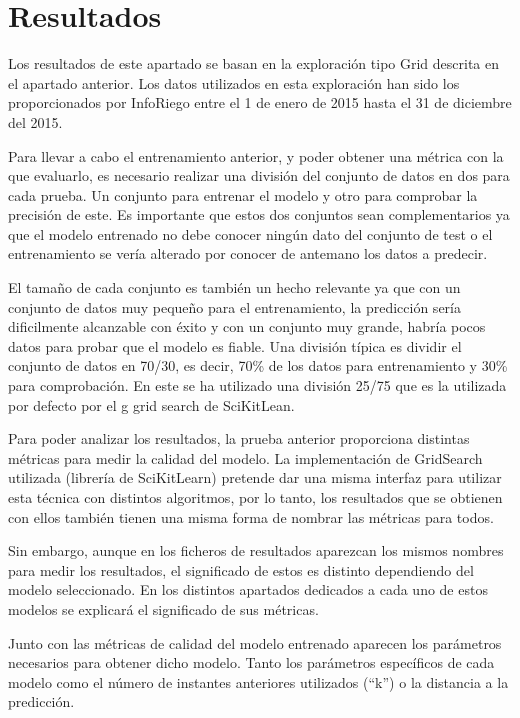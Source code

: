 \cleardoublepage

\chapter{Resultados}
\label{makereference7}

Los resultados de este apartado se basan en la exploración tipo Grid descrita en el apartado anterior. Los datos utilizados en esta exploración han sido los proporcionados por InfoRiego entre el 1 de enero de 2015 hasta el 31 de diciembre del 2015.

Para llevar a cabo el entrenamiento anterior, y poder obtener una métrica con la que evaluarlo, es necesario realizar una división del conjunto de datos en dos para cada prueba. Un conjunto para entrenar el modelo y otro para comprobar la precisión de este. Es importante que estos dos conjuntos sean complementarios ya que el modelo entrenado no debe conocer ningún dato del conjunto de test o el entrenamiento se vería alterado por conocer de antemano los datos a predecir.

El tamaño de cada conjunto es también un hecho relevante ya que con un conjunto de datos muy pequeño para el entrenamiento, la predicción sería dificilmente alcanzable con éxito y con un conjunto muy grande, habría pocos datos para probar que el modelo es fiable. Una división típica es dividir el conjunto de datos en 70/30, es decir, 70\% de los datos para entrenamiento y 30\% para comprobación. En este se ha utilizado una división 25/75 que es la utilizada por defecto por el g grid search de SciKitLean.

Para poder analizar los resultados, la prueba anterior proporciona distintas métricas para medir la calidad del modelo. La implementación de GridSearch utilizada (librería de SciKitLearn) pretende dar una misma interfaz para utilizar esta técnica con distintos algoritmos, por lo tanto, los resultados que se obtienen con ellos también tienen una misma forma de nombrar las métricas para todos.

Sin embargo, aunque en los ficheros de resultados aparezcan los mismos nombres para medir los resultados, el significado de estos es distinto dependiendo del modelo seleccionado. En los distintos apartados dedicados a cada uno de estos modelos se explicará el significado de sus métricas.

Junto con las métricas de calidad del modelo entrenado aparecen los parámetros necesarios para obtener dicho modelo. Tanto los parámetros específicos de cada modelo como el número de instantes anteriores utilizados (``k'') o la distancia a la predicción.

